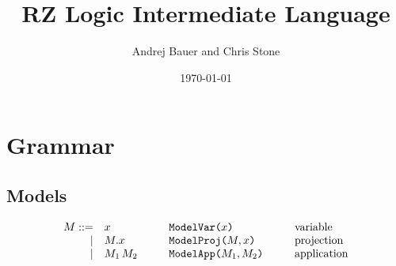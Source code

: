 \documentclass[12pt]{article}
\title{RZ Logic Intermediate Language}
\date{\today}
\author{Andrej Bauer and Chris Stone}
\newcommand{\M}{M}
\newcommand{\X}{\x} %
\newcommand{\n}{x} %
\newcommand{\x}{\n} %
\newcommand{\mMproj}[2]{#1.#2}
\newcommand{\mApp}[2]{#1\,#2}
\begin{document}
\maketitle
\section{Grammar}


\subsection{Models}
\[
\begin{array}{rl@{\hspace{1cm}}l@{\hspace{1cm}}l}
 \M ::= & \X & \texttt{ModelVar($\n$)} & \mbox{variable}\\
|&\mMproj{\M}{\n}&\texttt{ModelProj($\M,\n$)}&\mbox{projection}\\
|&\mApp{\M_1}{\M_2}&\texttt{ModelApp($\M_1,\M_2$)}&\mbox{application}\\
\end{array}
\]
\end{document}
